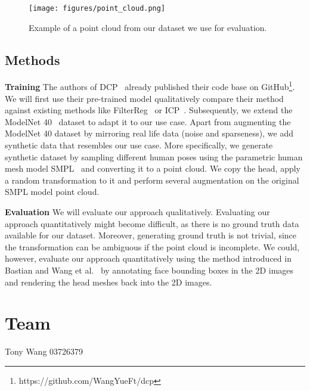 \documentclass[a4paper,pagesize 10pt]{scrartcl}
\begin{document}
\begin{figure}[!ht]
    \centering
    \texttt{[image: figures/point\_cloud.png]}
    \caption{Example of a point cloud from our dataset we use for evaluation.}
    \label{fig:example_pcd}
\end{figure}

\subsection{Methods}

\textbf{Training} The authors of DCP~\cite{dcp} already published their code base on GitHub\footnote{https://github.com/WangYueFt/dcp}.
We will first use their pre-trained model qualitatively compare their method against existing methods like FilterReg~\cite{filterreg} or ICP~\cite{icp}.
Subsequently, we extend the ModelNet 40~\cite{modelnet40} dataset to adapt it to our use case.
Apart from augmenting the ModelNet 40 dataset by mirroring real life data (noise and sparseness), we add synthetic data that resembles our use case.
More specifically, we generate synthetic dataset by sampling different human poses using the parametric human mesh model SMPL~\cite{SMPL:2015} and converting it to a point cloud. 
We copy the head, apply a random transformation to it and perform several augmentation on the original SMPL model point cloud.

\noindent\textbf{Evaluation}
We will evaluate our approach qualitatively.
Evaluating our approach quantitatively might become difficult, as there is no ground truth data available for our dataset.
Moreover, generating ground truth is not trivial, since the transformation can be ambiguous if the point cloud is incomplete.
We could, however, evaluate our approach quantitatively using the method introduced in Bastian and Wang et al.~\cite{disguisor} by annotating face bounding boxes in the 2D images and rendering the head meshes back into the 2D images.


\section{Team}
Tony Wang 03726379

{\small
	
	
}
\end{document}

